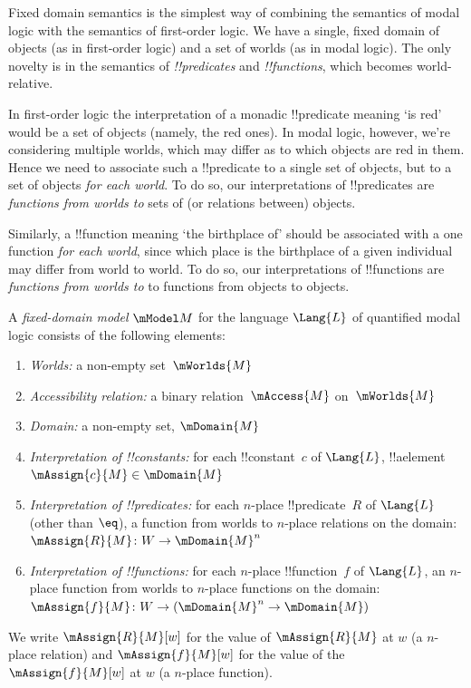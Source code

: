 \documentclass[../../../include/open-logic-section]{subfiles}
\begin{document}


\begin{explain}
Fixed domain semantics is the simplest way of combining the semantics
of modal logic with the semantics of first-order logic. We have a
single, fixed domain of objects (as in first-order logic) and a set of
worlds (as in modal logic). The only novelty is in the semantics of
\emph{!!{predicate}s} and \emph{!!{function}s}, which becomes
world-relative. 

In first-order logic the interpretation of a monadic !!{predicate}
meaning `is red' would be a set of objects (namely, the red ones). In
modal logic, however, we're considering multiple worlds, which may
differ as to which objects are red in them. Hence we need to associate
such a !!{predicate} to a single set of objects, but to a set of
objects \emph{for each world}. To do so, our interpretations of
!!{predicate}s are \emph{functions from worlds to} sets of (or
relations between) objects.

Similarly, a !!{function} meaning `the birthplace of' should be
associated with a one function \emph{for each world}, since which
place is the birthplace of a given individual may differ from world to
world. To do so, our interpretations of !!{function}s are
\emph{functions from worlds to} to functions from objects to objects.
\end{explain}

\begin{defn}
    A \emph{fixed-domain model} $\mModel M$ for the language $\Lang{L}$ 
    of quantified modal logic consists of the following elements:
    \begin{enumerate}
    \item \emph{Worlds:} a non-empty set~$\mWorlds{M}$
    \item \emph{Accessibility relation:} a binary relation~$\mAccess{M}$ on~$\mWorlds{M}$
    \item \emph{Domain:} a non-empty set, $\mDomain{M}$
\item \emph{Interpretation of !!{constant}s:} for each !!{constant}~$c$ of
  $\Lang{L}$, !!a{element} $\mAssign{c}{M} \in \mDomain{M}$
\item \emph{Interpretation of !!{predicate}s:} for each $n$-place
  !!{predicate}~$R$ of $\Lang{L}$ (other than $\eq$), a function 
  from worlds to $n$-place
  relations on the domain: $\mAssign{R}{M} \colon W \to \mDomain{M}^n$
\item \emph{Interpretation of !!{function}s:} for each $n$-place
  !!{function}~$f$ of $\Lang{L}$, an $n$-place function from worlds 
  to $n$-place functions on the domain: $\mAssign{f}{M} \colon W \to 
  (\mDomain{M}^n \to \mDomain{M})$

\end{enumerate}

We write $\mAssign{R}{M}[w]$ for the value of $\mAssign{R}{M}$ at $w$ (a $n$-place relation) and $\mAssign{f}{M}[w]$ for the value of the 
$\mAssign{f}{M}[w]$ at $w$ (a $n$-place function). 
\end{defn}
\end{document}
